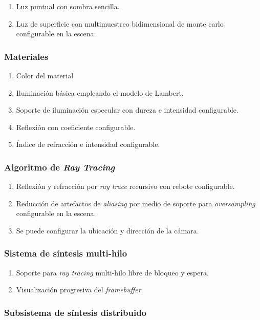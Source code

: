 \documentclass[]{article}
\begin{document}
\begin{enumerate}
 \item Luz puntual con sombra sencilla.
 \item Luz de superficie con multimuestreo bidimensional de monte carlo configurable en la escena.
\end{enumerate}

\subsubsection{Materiales}

\begin{enumerate}
 \item Color del material
 \item Iluminación básica empleando el modelo de Lambert.
 \item Soporte de iluminación especular con dureza e intensidad configurable.
 \item Reflexión con coeficiente configurable.
 \item Índice de refracción e intensidad configurable.
\end{enumerate}


\subsubsection{Algoritmo de \emph{Ray Tracing}}
\begin{enumerate}
 \item Reflexión y refracción por \emph{ray trace} recursivo con rebote configurable.
 \item Reducción de artefactos de \emph{aliasing} por medio de soporte para \emph{oversampling} configurable en la escena.
 \item Se puede configurar la ubicación y dirección de la cámara.
\end{enumerate}

\subsubsection{Sistema de síntesis multi-hilo}

\begin{enumerate}
  \item Soporte para \emph{ray tracing} multi-hilo libre de bloqueo y espera.
  \item Visualización progresiva del \emph{framebuffer}.
\end{enumerate}

\subsubsection{Subsistema de síntesis distribuido}
\end{document}
